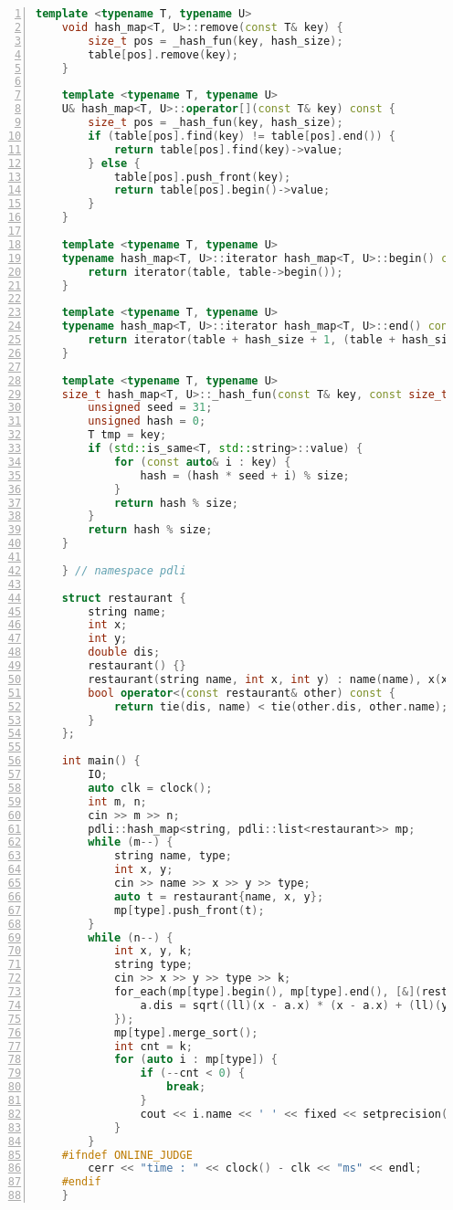 \documentclass{article}
\begin{document}
\begin{lstlisting}[xleftmargin = 2em,xrightmargin = 2em, aboveskip = 0.5em, numbers = left, language = C++]
    template <typename T, typename U>
    void hash_map<T, U>::remove(const T& key) {
        size_t pos = _hash_fun(key, hash_size);
        table[pos].remove(key);
    }

    template <typename T, typename U>
    U& hash_map<T, U>::operator[](const T& key) const {
        size_t pos = _hash_fun(key, hash_size);
        if (table[pos].find(key) != table[pos].end()) {
            return table[pos].find(key)->value;
        } else {
            table[pos].push_front(key);
            return table[pos].begin()->value;
        }
    }

    template <typename T, typename U>
    typename hash_map<T, U>::iterator hash_map<T, U>::begin() const {
        return iterator(table, table->begin());
    }

    template <typename T, typename U>
    typename hash_map<T, U>::iterator hash_map<T, U>::end() const {
        return iterator(table + hash_size + 1, (table + hash_size + 1)->end());
    }

    template <typename T, typename U>
    size_t hash_map<T, U>::_hash_fun(const T& key, const size_t& size) {
        unsigned seed = 31;
        unsigned hash = 0;
        T tmp = key;
        if (std::is_same<T, std::string>::value) {
            for (const auto& i : key) {
                hash = (hash * seed + i) % size;
            }
            return hash % size;
        }
        return hash % size;
    }

    } // namespace pdli

    struct restaurant {
        string name;
        int x;
        int y;
        double dis;
        restaurant() {}
        restaurant(string name, int x, int y) : name(name), x(x), y(y) {}
        bool operator<(const restaurant& other) const {
            return tie(dis, name) < tie(other.dis, other.name);
        }
    };

    int main() {
        IO;
        auto clk = clock();
        int m, n;
        cin >> m >> n;
        pdli::hash_map<string, pdli::list<restaurant>> mp;
        while (m--) {
            string name, type;
            int x, y;
            cin >> name >> x >> y >> type;
            auto t = restaurant{name, x, y};
            mp[type].push_front(t);
        }
        while (n--) {
            int x, y, k;
            string type;
            cin >> x >> y >> type >> k;
            for_each(mp[type].begin(), mp[type].end(), [&](restaurant& a) {
                a.dis = sqrt((ll)(x - a.x) * (x - a.x) + (ll)(y - a.y) * (y - a.y));
            });
            mp[type].merge_sort();
            int cnt = k;
            for (auto i : mp[type]) {
                if (--cnt < 0) {
                    break;
                }
                cout << i.name << ' ' << fixed << setprecision(3) << i.dis << endl;
            }
        }
    #ifndef ONLINE_JUDGE
        cerr << "time : " << clock() - clk << "ms" << endl;
    #endif
    }
    \end{lstlisting}
\end{document}
